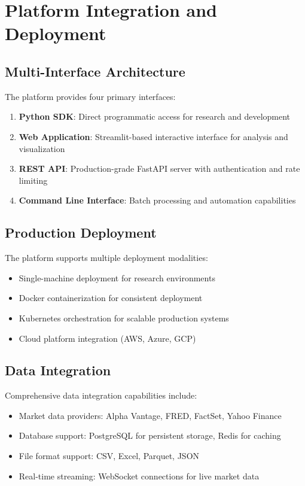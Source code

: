 \documentclass[12pt,a4paper]{article}
\theoremstyle{definition}
\theoremstyle{remark}
\begin{document}
\section{Platform Integration and Deployment}

\subsection{Multi-Interface Architecture}

The platform provides four primary interfaces:

\begin{enumerate}
    \item \textbf{Python SDK}: Direct programmatic access for research and development
    \item \textbf{Web Application}: Streamlit-based interactive interface for analysis and visualization
    \item \textbf{REST API}: Production-grade FastAPI server with authentication and rate limiting
    \item \textbf{Command Line Interface}: Batch processing and automation capabilities
\end{enumerate}

\subsection{Production Deployment}

The platform supports multiple deployment modalities:

\begin{itemize}
    \item Single-machine deployment for research environments
    \item Docker containerization for consistent deployment
    \item Kubernetes orchestration for scalable production systems
    \item Cloud platform integration (AWS, Azure, GCP)
\end{itemize}

\subsection{Data Integration}

Comprehensive data integration capabilities include:

\begin{itemize}
    \item Market data providers: Alpha Vantage, FRED, FactSet, Yahoo Finance
    \item Database support: PostgreSQL for persistent storage, Redis for caching
    \item File format support: CSV, Excel, Parquet, JSON
    \item Real-time streaming: WebSocket connections for live market data
\end{itemize}
\end{document}
